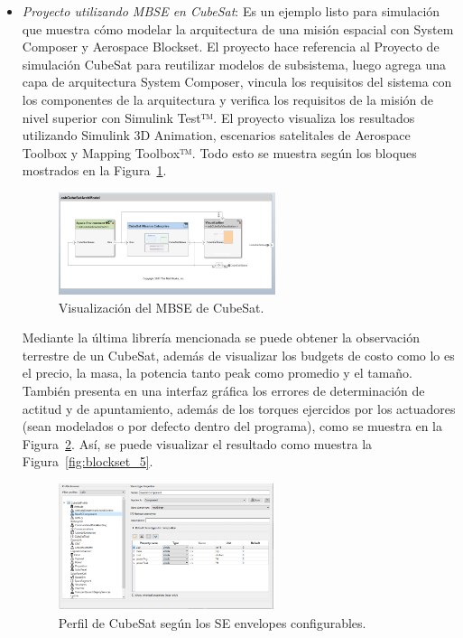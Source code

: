 \begin{itemize}
	\item \textit{Proyecto utilizando \gls{MBSE} en CubeSat}: Es un ejemplo listo para simulación que muestra cómo modelar la arquitectura de una misión espacial con System Composer y Aerospace Blockset. El proyecto hace referencia al Proyecto de simulación CubeSat para reutilizar modelos de subsistema, luego agrega una capa de arquitectura System Composer, vincula los requisitos del sistema con los componentes de la arquitectura y verifica los requisitos de la misión de nivel superior con Simulink Test™. El proyecto visualiza los resultados utilizando Simulink 3D Animation, escenarios satelitales de Aerospace Toolbox y Mapping Toolbox™. Todo esto se muestra según los bloques mostrados en la Figura~\ref{fig:blockset_3}.
	
	\begin{figure}[H]
		\centering    
		\includegraphics[width=0.6\textwidth]{blockset_3.png}
		\caption{Visualización del MBSE de CubeSat.}
		\label{fig:blockset_3}
	\end{figure}	
	
	Mediante la última librería mencionada se puede obtener la observación terrestre de un CubeSat, además de visualizar los budgets de costo como lo es el precio, la masa, la potencia tanto peak como promedio y el tamaño. También presenta en una interfaz gráfica los errores de determinación de actitud y de apuntamiento, además de los torques ejercidos por los actuadores (sean modelados o por defecto dentro del programa), como se muestra en la Figura~\ref{fig:blockset_4}. Así, se puede visualizar el resultado como muestra la Figura~\ref{fig:blockset_5}.
	
	\begin{figure}[H]
		\centering    
		\includegraphics[width=0.6\textwidth]{blockset_4.png}
		\caption{Perfil de CubeSat según los SE envelopes configurables.}
		\label{fig:blockset_4}
	\end{figure}	
	

\end{itemize}
